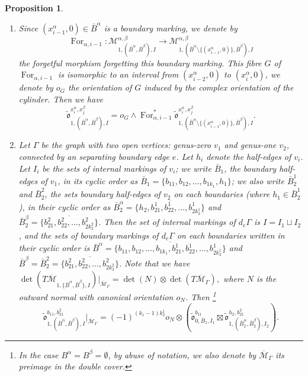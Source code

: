 \documentclass[11pt,a4paper]{article}
\newtheorem{prop}[dummy]{Proposition}
\theoremstyle{definition}
\theoremstyle{remark}
\numberwithin{equation}{section}
\def\Mbar{{\overline{\mathcal M}}}
\begin{document}
\begin{prop}
\begin{enumerate}
       
        
        \item \label{item genus one orientation moduli forget boundary marking}
        Since $(x^\alpha_{i-1},0) \in \bar{B}^\alpha$ is a boundary marking, we denote by
         $$
        \operatorname{For}_{\alpha,i-1}\colon \mathcal M^{\alpha,\beta}_{1,(\bar{B}^\alpha,\bar{B}^\beta),I} \to \mathcal M^{\alpha,\beta}_{1,(\bar{B}^\alpha\setminus\{(x^\alpha_{i-1},0)\},\bar{B}^\beta),I}
        $$
        the forgetful morphism forgetting this boundary marking. This fibre $G$ of $\operatorname{For}_{\alpha,i-1}$ is isomorphic to an interval from $(x^\alpha_{i-2},0)$ to $(x^\alpha_{i},0)$, we denote by $o_G$ the orientation of $G$ induced by the complex orientation of the cylinder. Then we have
        $$\tilde{\mathfrak o}^{x^\alpha_{i},x^\beta_j}_{1,(\bar{B}^\alpha,\bar{B}^\beta),I}=o_G\wedge \operatorname{For}_{\alpha,i-1}^*\tilde{\mathfrak o}^{x^\alpha_{i},x^\beta_j}_{1,(\bar{B}^\alpha\setminus\{(x^\alpha_{i-1},0)\},\bar{B}^\beta),I}.$$ 
        
        \item \label{item orientation moduli open open g=1}
        Let $\Gamma$ be the graph with two open vertices: genus-zero $v_1$ and genus-one $v_2$, connected by an separating boundary edge $e$. Let $h_i$ denote the half-edges of $v_i$. Let $I_i$ be the sets of internal markings of $v_i$; we write $\bar{B}_1$, the boundary half-edges of $v_1$, in its cyclic order as $\bar{B}_1=\{b_{11},b_{12},\dots,b_{1k_1},h_1\}$; we also write $\bar{B}^1_2$ and $\bar{B}^2_2$, the sets boundary half-edges of $v_2$ on each boundaries (where $h_1\in \bar{B}_{2}^1$), in their cyclic order as $\bar{B}_{2}^\alpha=\overline{\{h_2,b_{21}^1,b_{22}^1,\dots,b_{2k_2^1}^1\}}$ and $\bar{B}_{2}^\beta=\overline{\{b_{21}^2,b_{22}^2,\dots,b_{2k_2^2}^2\}}$. Then the set of internal markings of $d_e \Gamma$ is $I=I_1\sqcup I_2$, and the sets of boundary markings of $d_e \Gamma$ on each boundaries written in their cyclic order is $\bar{B}^\alpha=\overline{\{b_{11},b_{12},\dots,b_{1k_1},b_{21}^1,b_{22}^1,\dots,b_{2k_2^1}^1\}}$ and $\bar{B}^\beta=\bar{B}_{2}^2=\overline{\{b_{21}^2,b_{22}^2,\dots,b_{2k_2^2}^2\}}$. 
        Note that we have $\det(T\Mbar_{1,\{\bar{B}^\alpha,\bar B^\beta\},I})\big|_{\Mbar_\Gamma} = \det(N)\otimes \det( T\Mbar_{\Gamma}),$ where $N$ is the outward normal with canonical orientation $o_N$. Then \footnote{In the case $B^\alpha=B^\beta=\emptyset$, by abuse of notation, we also denote by $\Mbar_{\Gamma}$ its preimage in the double cover.}
        \begin{equation}\label{eq orientation moduli open open g=1}
        \tilde{\mathfrak{o}}^{b_{11},b_{21}^2}_{1,(\bar{B}^\alpha,\bar B^\beta),I}\big |_{\Mbar_\Gamma^{}}=(-1)^{(k_1-1)k_2^1}o_N\otimes
         \left(\tilde{\mathfrak{o}}^{b_{11}}_{0,\bar B_1,I_1}\boxtimes\tilde{\mathfrak{o}}^{h_2,b_{21}^2}_{1,(\bar B_2^\alpha, \bar B_2^\beta),I_2}\right).
         \end{equation}
         


\end{enumerate}
\end{prop}
\end{document}
